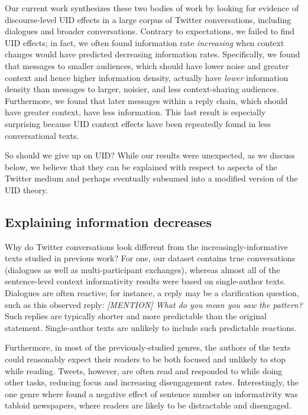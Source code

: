 \documentclass[11pt,letterpaper]{article}
\begin{document}
Our current work synthesizes these two bodies of work by looking for evidence of discourse-level UID effects in a large corpus of Twitter conversations, including dialogues and broader conversations.  Contrary to expectations, we failed to find UID effects; in fact, we often found information rate \emph{increasing} when context changes would have predicted decreasing information rates.  Specifically, we found that messages to smaller audiences, which should have lower noise and greater context and hence higher information density, actually have \emph{lower} information density than messages to larger, noisier, and less context-sharing audiences. Furthermore, we found that later messages within a reply chain, which should have greater context, have less information.  This last result is especially surprising because UID context effects have been repeatedly found in less conversational texts.

So should we give up on UID? While our results were unexpected, as we discuss below, we believe that they can be explained with respect to aspects of the Twitter medium and perhaps eventually subsumed into a modified version of the UID theory.

\subsection{Explaining information decreases}

Why do Twitter conversations look different from the increasingly-informative texts studied in previous work? For one, our dataset contains true conversations (dialogues as well as multi-participant exchanges), whereas almost all of the sentence-level context informativity results were based on single-author texts.  Dialogues are often reactive; for instance, a reply may be a clarification question, such as this observed reply: {\it [MENTION] What do you mean you saw the pattern?}  Such replies are typically shorter and more predictable than the original statement.  Single-author texts are unlikely to include such predictable reactions.

Furthermore, in most of the previously-studied genres, the authors of the texts could reasonably expect their readers to be both focused and unlikely to stop while reading. Tweets, however, are often read and responded to while doing other tasks, reducing focus and increasing disengagement rates.  Interestingly, the one genre where  found a negative effect of sentence number on informativity was tabloid newspapers, where readers are likely to be distractable and disengaged.
\end{document}

